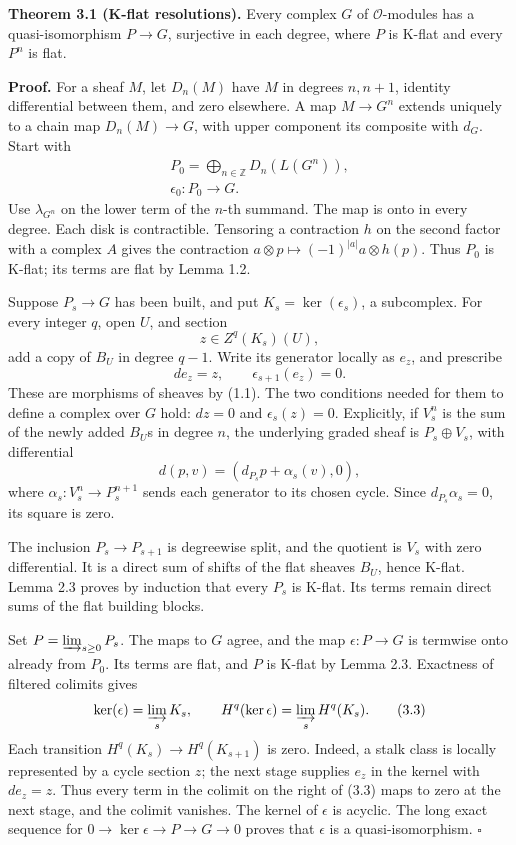\documentclass[
  english,
  11pt,
  a4paper,
]{article}
\begin{document}
\textbf{Theorem 3.1 (K-flat resolutions).} Every complex \(G\) of
\(\mathcal O\)-modules has a quasi-isomorphism \(P\to G\), surjective in
each degree, where \(P\) is K-flat and every \(P^n\) is flat.

\textbf{Proof.} For a sheaf \(M\), let \(D_n(M)\) have \(M\) in degrees
\(n,n+1\), identity differential between them, and zero elsewhere. A map
\(M\to G^n\) extends uniquely to a chain map \(D_n(M)\to G\), with upper
component its composite with \(d_G\). Start with \[\begin{gathered}
P_0=\bigoplus_{n\in\mathbb Z}D_n(L(G^n)),\\
\epsilon_0:P_0\longrightarrow G.
\end{gathered}
\tag{3.1}\] Use \(\lambda_{G^n}\) on the lower term of the \(n\)-th
summand. The map is onto in every degree. Each disk is contractible.
Tensoring a contraction \(h\) on the second factor with a complex \(A\)
gives the contraction \(a\otimes p\mapsto(-1)^{|a|}a\otimes h(p)\). Thus
\(P_0\) is K-flat; its terms are flat by Lemma 1.2.

Suppose \(P_s\to G\) has been built, and put \(K_s=\ker(\epsilon_s)\), a
subcomplex. For every integer \(q\), open \(U\), and section
\[z\in Z^q(K_s)(U),\] add a copy of \(B_U\) in degree \(q-1\). Write its
generator locally as \(e_z\), and prescribe
\[d e_z=z,\qquad \epsilon_{s+1}(e_z)=0.
\tag{3.2}\] These are morphisms of sheaves by (1.1). The two conditions
needed for them to define a complex over \(G\) hold: \(dz=0\) and
\(\epsilon_s(z)=0\). Explicitly, if \(V_s^n\) is the sum of the newly
added \(B_U\)\textquotesingle s in degree \(n\), the underlying graded
sheaf is \(P_s\oplus V_s\), with differential
\[d(p,v)=(d_{P_s}p+\alpha_s(v),0),\] where
\(\alpha_s:V_s^n\to P_s^{n+1}\) sends each generator to its chosen
cycle. Since \(d_{P_s}\alpha_s=0\), its square is zero.

The inclusion \(P_s\to P_{s+1}\) is degreewise split, and the quotient
is \(V_s\) with zero differential. It is a direct sum of shifts of the
flat sheaves \(B_U\), hence K-flat. Lemma 2.3 proves by induction that
every \(P_s\) is K-flat. Its terms remain direct sums of the flat
building blocks.

Set \(P=\varinjlim_{s\geq0}P_s\). The maps to \(G\) agree, and the map
\(\epsilon:P\to G\) is termwise onto already from \(P_0\). Its terms are
flat, and \(P\) is K-flat by Lemma 2.3. Exactness of filtered colimits
gives \[\ker(\epsilon)=\varinjlim_s K_s,\qquad
H^q(\ker\epsilon)=\varinjlim_s H^q(K_s).
\tag{3.3}\] Each transition \(H^q(K_s)\to H^q(K_{s+1})\) is zero.
Indeed, a stalk class is locally represented by a cycle section \(z\);
the next stage supplies \(e_z\) in the kernel with \(de_z=z\). Thus
every term in the colimit on the right of (3.3) maps to zero at the next
stage, and the colimit vanishes. The kernel of \(\epsilon\) is acyclic.
The long exact sequence for \(0\to\ker\epsilon\to P\to G\to0\) proves
that \(\epsilon\) is a quasi-isomorphism. \(\square\)
\end{document}
